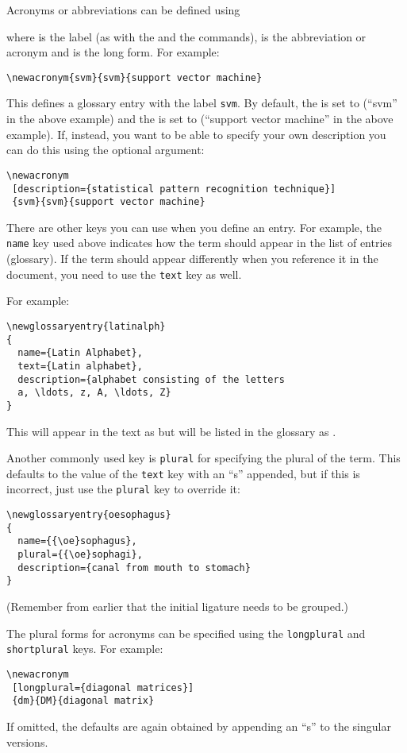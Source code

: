 \documentclass{nlctdoc}
\begin{document}
Acronyms or abbreviations can be defined using
\begin{definition}
\end{definition}
where  is the label (as with the 
and the  commands),  is the abbreviation or
acronym and  is the long form. For example:
\begin{verbatim}
\newacronym{svm}{svm}{support vector machine}
\end{verbatim}
This defines a glossary entry with the label \texttt{svm}. By
default, the  is set to  (``svm'' in the
above example) and the  is set to 
(``support vector machine'' in the above example). If, instead, you
want to be able to specify your own description you can do this
using the optional argument:
\begin{verbatim}
\newacronym
 [description={statistical pattern recognition technique}]
 {svm}{svm}{support vector machine}
\end{verbatim}

There are other keys you can use when you define an entry. For
example, the \texttt{name} key used above indicates how the term
should appear in the list of entries (glossary). If the term should
appear differently when you reference it in the document, you need
to use the \texttt{text} key as well.

For example:
\begin{verbatim}
\newglossaryentry{latinalph}
{
  name={Latin Alphabet},
  text={Latin alphabet},
  description={alphabet consisting of the letters 
  a, \ldots, z, A, \ldots, Z}
}
\end{verbatim}
This will appear in the text as  but will be listed in
the glossary as .

Another commonly used key is \texttt{plural} for specifying the
plural of the term. This defaults to the value of the \texttt{text}
key with an ``s'' appended, but if this is incorrect, just use the
\texttt{plural} key to override it:
\begin{verbatim}
\newglossaryentry{oesophagus}
{
  name={{\oe}sophagus},
  plural={{\oe}sophagi},
  description={canal from mouth to stomach}
}
\end{verbatim}
(Remember from earlier that the initial ligature  needs to
be grouped.)

The plural forms for acronyms can be specified using the
\texttt{longplural} and \texttt{shortplural} keys. For example:
\begin{verbatim}
\newacronym
 [longplural={diagonal matrices}]
 {dm}{DM}{diagonal matrix}
\end{verbatim}
If omitted, the defaults are again obtained by appending an ``s'' to
the singular versions.
\end{document}
